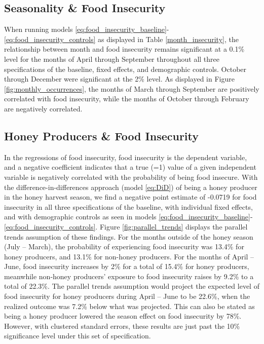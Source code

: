 \documentclass[../main.tex]{subfiles}
\begin{document}
\subsection{Seasonality \& Food Insecurity}

When running models \ref{eq:food_insecurity_baseline}-\ref{eq:food_insecurity_controls} as displayed in Table \ref{month_insecurity}, the relationship between month and food insecurity remains significant at a 0.1\% level for the months of April through September throughout all three specifications of the baseline, fixed effects, and demographic controls.  October through December were significant at the 2\% level. As displayed in Figure \ref{fig:monthly_occurrences}, the months of March through September are positively correlated with food insecurity, while the months of October through February are negatively correlated.  
\subsection{Honey Producers \& Food Insecurity}

In the regressions of food insecurity, food insecurity is the dependent variable, and a negative coefficient indicates that a true (=1) value of a given independent variable is negatively correlated with the probability of being food insecure. With the difference-in-differences approach (model \ref{eq:DiD}) of being a honey producer in the honey harvest season, we find a negative point estimate of -0.0719 for food insecurity in all three specifications of the baseline, with individual fixed effects, and with demographic controls as seen in models \ref{eq:food_insecurity_baseline}-\ref{eq:food_insecurity_controls}. Figure \ref{fig:parallel_trends} displays the parallel trends assumption of these findings. For the months outside of the honey season (July – March), the probability of experiencing food insecurity was 13.4\% for honey producers, and 13.1\% for non-honey producers. For the months of April – June, food insecurity increases by 2\% for a total of 15.4\% for honey producers, meanwhile non-honey producers’ exposure to food insecurity raises by 9.2\% to a total of 22.3\%. The parallel trends assumption would project the expected level of food insecurity for honey producers during April – June to be 22.6\%, when the realized outcome was 7.2\% below what was projected. This can also be stated as being a honey producer lowered the season effect on food insecurity by 78\%. However, with clustered standard errors, these results are just past the 10\% significance level under this set of specification.
\end{document}
